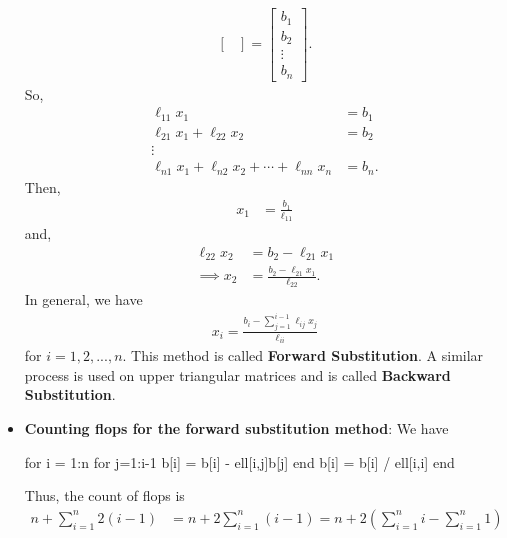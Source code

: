 \documentclass{report}
\begin{document}
\begin{itemize}
\begin{align*}
\begin{bmatrix}
                \end{bmatrix}
                =
                \begin{bmatrix}
                    b_{1} \\ b_{2} \\ \vdots \\ b_{n}
                \end{bmatrix}
            .\end{align*}
            So,
            \begin{align*}
                \ell_{11}x_{1} &= b_{1} \\
                \ell_{21}x_{1} + \ell_{22}x_{2} &= b_{2} \\
                \vdots \\
                \ell_{n1}x_{1} + \ell_{n2}x_{2} + \cdots + \ell_{nn}x_{n} &= b_{n}
            .\end{align*}
            Then,
            \begin{align*}
                x_{1} &= \frac{b_{1}}{\ell_{11}}
            \end{align*}
            and,
            \begin{align*}
                \ell_{22}x_{2} &= b_{2} - \ell_{21}x_{1} \\
                \implies x_{2} &= \frac{b_{2}-\ell_{21}x_{1}}{\ell_{22}}
            .\end{align*}
            In general, we have
            \begin{align*}
                x_{i} = \frac{b_{i} - \sum_{j=1}^{i-1}\ell_{ij}x_{j}}{\ell_{ii}}
            \end{align*}
            for $i =1,2,...,n $. This method is called \textbf{Forward Substitution}.
            \bigbreak \noindent 
            A similar process is used on upper triangular matrices and is called \textbf{Backward Substitution}.
        \item \textbf{Counting flops for the forward substitution method}: We have 
                \begin{jlcode}
                for i = 1:n
                    for j=1:i-1
                        b[i] = b[i] - ell[i,j]b[j]
                    end
                    b[i] = b[i] / ell[i,i]
                end
                \end{jlcode}
            Thus, the count of flops is
            \begin{align*}
                n+\sum_{i=1}^{n}2(i-1) &= n+2 \sum_{i=1}^{n}(i-1) = n+2 \left( \sum_{i=1}^{n}i - \sum_{i=1}^{n} 1\right)  \\

\end{align*}
\end{itemize}
\end{document}
